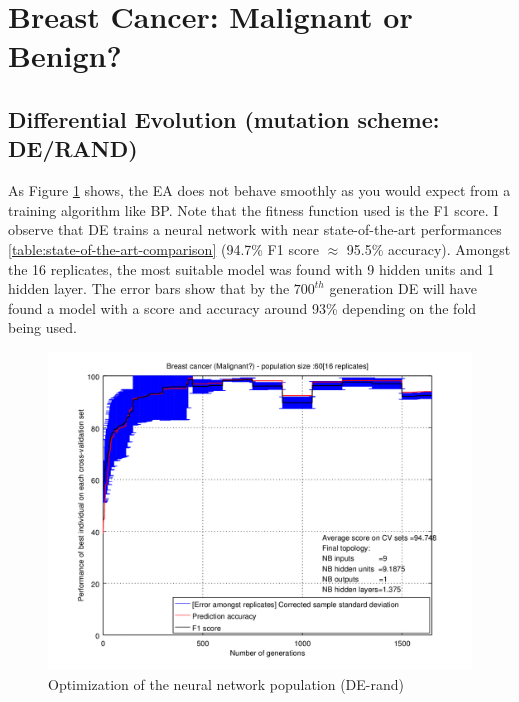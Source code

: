 \documentclass[a4paper,12pt, oneside]{memoir}
\begin{document}
\newpage

\section{Breast Cancer: Malignant or Benign?}

\subsection{Differential Evolution (mutation scheme: DE/RAND)}

As Figure \ref{malignant-perfs-DE-rand} shows, the EA does not behave smoothly as you would expect from a training algorithm like BP. Note that the fitness function used is the F1 score. I observe that DE trains a neural network with near state-of-the-art performances \ref{table:state-of-the-art-comparison} (94.7\% F1 score $\approx$ 95.5\% accuracy). Amongst the 16 replicates, the most suitable model was found with 9 hidden units and 1 hidden layer. The error bars show that by the $700^{th}$ generation DE will have found a model with a score and accuracy around 93\% depending on the fold being used.

\begin{figure}[h]
  \centering
  \includegraphics[scale=0.7]{malignant-performancesVSepochs-DE}
  \vspace{-12pt}
  \caption{Optimization of the neural network population (DE-rand)}
  \label{malignant-perfs-DE-rand}
\end{figure}
\end{document}
